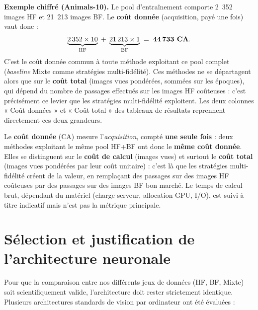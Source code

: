 \documentclass[11pt,a4paper,openany]{book}
\begin{document}
\vspace{0.6em}
\textbf{Exemple chiffré (Animals-10).} Le pool d'entraînement comporte 2~352 images HF et 21~213 images BF. Le \textbf{coût donnée} (acquisition, payé une fois) vaut donc :
\[
  \underbrace{2\,352 \times 10}_{\text{HF}} \;+\; \underbrace{21\,213 \times 1}_{\text{BF}} \;=\; \textbf{44\,733 CA}.
\]
C'est le coût donnée commun à toute méthode exploitant ce pool complet (\textit{baseline} Mixte comme stratégies multi-fidélité). Ces méthodes ne se départagent alors que sur le \textbf{coût total} (images vues pondérées, sommées sur les époques), qui dépend du nombre de passages effectués sur les images HF coûteuses : c'est précisément ce levier que les stratégies multi-fidélité exploitent. Les deux colonnes « Coût données » et « Coût total » des tableaux de résultats reprennent directement ces deux grandeurs.

\vspace{0.3em}

\begin{hypothesebox}
  Le \textbf{coût donnée} (CA) mesure l'\emph{acquisition}, compté \textbf{une seule fois} : deux méthodes exploitant le même pool HF+BF ont donc le \textbf{même coût donnée}. Elles se distinguent sur le \textbf{coût de calcul} (images vues) et surtout le \textbf{coût total} (images vues pondérées par leur coût unitaire) : c'est là que les stratégies multi-fidélité créent de la valeur, en remplaçant des passages sur des images HF coûteuses par des passages sur des images BF bon marché. Le temps de calcul brut, dépendant du matériel (charge serveur, allocation GPU, I/O), est suivi à titre indicatif mais n'est pas la métrique principale.
\end{hypothesebox}

\section{Sélection et justification de l'architecture neuronale}

Pour que la comparaison entre nos différents jeux de données (HF, BF, Mixte) soit scientifiquement valide, l'architecture doit rester strictement identique. Plusieurs architectures standards de vision par ordinateur ont été évaluées :
\end{document}

